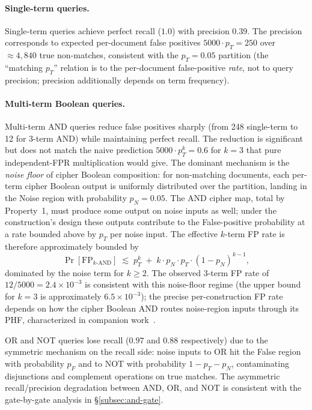 \documentclass[11pt]{article}
\theoremstyle{definition}
\theoremstyle{plain}
\theoremstyle{remark}
\begin{document}
\paragraph{Single-term queries.}
Single-term queries achieve perfect recall ($1.0$) with precision
$0.39$.  The precision corresponds to expected per-document false
positives $5000 \cdot p_T = 250$ over $\approx 4{,}840$ true
non-matches, consistent with the $p_T = 0.05$ partition (the
``matching $p_T$'' relation is to the per-document false-positive
\emph{rate}, not to query precision; precision additionally depends on
term frequency).

\paragraph{Multi-term Boolean queries.}
Multi-term AND queries reduce false positives sharply (from 248
single-term to 12 for 3-term AND) while maintaining perfect recall.
The reduction is significant but does not match the naive prediction
$5000 \cdot p_T^k = 0.6$ for $k=3$ that pure independent-FPR
multiplication would give.  The dominant mechanism is the
\emph{noise floor} of cipher Boolean composition: for non-matching
documents, each per-term cipher Boolean output is uniformly
distributed over the partition, landing in the Noise region with
probability $p_N = 0.05$.  The AND cipher map, total by Property~1,
must produce some output on noise inputs as well; under the
construction's design these outputs contribute to the False-positive
probability at a rate bounded above by $p_T$ per noise input.  The
effective $k$-term FP rate is therefore approximately bounded by
\begin{equation}
\Pr[\text{FP}_{k\text{-AND}}] \;\lesssim\; p_T^k
  \;+\; k \cdot p_N \cdot p_T \cdot (1-p_N)^{k-1},
\end{equation}
dominated by the noise term for $k \geq 2$.  The observed 3-term FP
rate of $12/5000 = 2.4 \times 10^{-3}$ is consistent with this
noise-floor regime (the upper bound for $k=3$ is approximately
$6.5 \times 10^{-3}$); the precise per-construction FP rate depends
on how the cipher Boolean AND routes noise-region inputs through its
PHF, characterized in companion work~\cite{towell2026algebraic}.

OR and NOT queries lose recall ($0.97$ and $0.88$ respectively) due
to the symmetric mechanism on the recall side: noise inputs to OR
hit the False region with probability $p_F$ and to NOT with
probability $1 - p_T - p_N$, contaminating disjunctions and
complement operations on true matches.  The asymmetric
recall/precision degradation between AND, OR, and NOT is consistent
with the gate-by-gate analysis in \S\ref{subsec:and-gate}.
\end{document}
